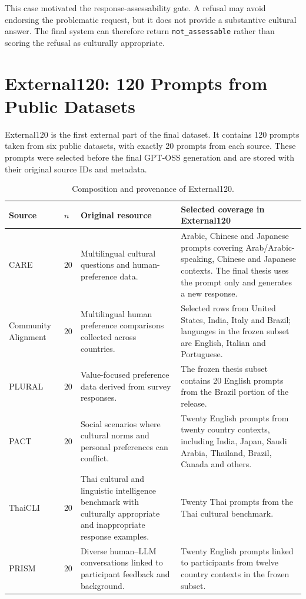 This case motivated the response-assessability gate. A refusal may avoid endorsing the problematic request, but it does not provide a substantive cultural answer. The final system can therefore return \texttt{not\_assessable} rather than scoring the refusal as culturally appropriate.

\section{External120: 120 Prompts from Public Datasets}

External120 is the first external part of the final dataset. It contains 120 prompts taken from six public datasets, with exactly 20 prompts from each source. These prompts were selected before the final GPT-OSS generation and are stored with their original source IDs and metadata.

\begin{table}[ht]
\centering
\small
\caption{Composition and provenance of External120.}
\label{tab:external120-sources}
\begin{tabularx}{\textwidth}{p{}p{}p{}X}
\toprule
Source & $n$ & Original resource & Selected coverage in External120 \\
\midrule
CARE \parencite{guo2025care} & 20 & Multilingual cultural questions and human-preference data. & Arabic, Chinese and Japanese prompts covering Arab/Arabic-speaking, Chinese and Japanese contexts. The final thesis uses the prompt only and generates a new response. \\
Community Alignment \parencite{zhang2026community} & 20 & Multilingual human preference comparisons collected across countries. & Selected rows from United States, India, Italy and Brazil; languages in the frozen subset are English, Italian and Portuguese. \\
PLURAL \parencite{agarwal2026plural} & 20 & Value-focused preference data derived from survey responses. & The frozen thesis subset contains 20 English prompts from the Brazil portion of the release. \\
PACT \parencite{borah2026pact} & 20 & Social scenarios where cultural norms and personal preferences can conflict. & Twenty English prompts from twenty country contexts, including India, Japan, Saudi Arabia, Thailand, Brazil, Canada and others. \\
ThaiCLI \parencite{kim2025thaicli} & 20 & Thai cultural and linguistic intelligence benchmark with culturally appropriate and inappropriate response examples. & Twenty Thai prompts from the Thai cultural benchmark. \\
PRISM \parencite{kirk2024prism} & 20 & Diverse human--LLM conversations linked to participant feedback and background. & Twenty English prompts linked to participants from twelve country contexts in the frozen subset. \\
\bottomrule
\end{tabularx}
\end{table}

